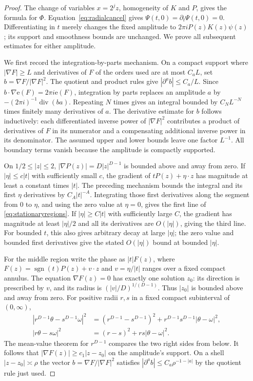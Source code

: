 \documentclass[11pt,oneside]{article}
\theoremstyle{definition}\newtheorem{definition}[theorem]{Definition}
\theoremstyle{remark}\newtheorem{remark}[theorem]{Remark}
\newcommand{\ee}[1]{\mathrm e\!\left(#1\right)}
\DeclareMathOperator{\sgn}{sgn}
\begin{document}
\begin{proof}
The change of variables $x=2^jz$, homogeneity of $K$ and $P$, gives the
formula for $\Phi$. Equation~\eqref{eq:radialcancel} gives
$\Psi(t,0)=\partial_t\Psi(t,0)=0$. Differentiating in $t$ merely changes the
fixed amplitude to $2\pi iP(z)K(z)\psi(z)$; its support and smoothness bounds
are unchanged. We prove all subsequent estimates for either amplitude.

We first record the integration-by-parts mechanism. On a compact support
where $|\nabla F|\geq L$ and derivatives of $F$ of the orders used are at most
$C_aL$, set $b=\nabla F/|\nabla F|^2$. The quotient and product rules give
$|\partial^a b|\leq C_a/L$. Since
$b\cdot\nabla\ee{F}=2\pi i\ee{F}$, integration by parts replaces an amplitude
$a$ by $-(2\pi i)^{-1}\operatorname{div}(ba)$. Repeating $N$ times gives an
integral bounded by $C_NL^{-N}$ times finitely many derivatives of $a$.
The derivative estimate for $b$ follows inductively: each differentiated
inverse power of $|\nabla F|^2$ contributes a product of derivatives of $F$
in its numerator and a compensating additional inverse power in its
denominator. The assumed upper and lower bounds leave one factor $L^{-1}$.
All boundary terms vanish because the amplitude is compactly supported.

On $1/2\leq|z|\leq2$, $|\nabla P(z)|=D|z|^{D-1}$ is bounded above and away
from zero. If $|\eta|\leq c|t|$ with sufficiently small $c$, the gradient of
$tP(z)+\eta\cdot z$ has magnitude at least a constant times $|t|$.
The preceding mechanism bounds the integral and its first $\eta$ derivatives
by $C_A|t|^{-A}$. Integrating those first derivatives along the segment from
$0$ to $\eta$, and using the zero value at $\eta=0$, gives the first line
of \eqref{eq:stationaryregions}. If $|\eta|\geq C|t|$ with sufficiently large
$C$, the gradient has magnitude at least $|\eta|/2$ and all its derivatives
are $O(|\eta|)$, giving the third line. For bounded $t$, this also gives
arbitrary decay at large $|\eta|$; the zero value and bounded first derivatives
give the stated $O(|\eta|)$ bound at bounded $|\eta|$.

For the middle region write the phase as
$|t|F(z)$, where $F(z)=\sgn(t)P(z)+v\cdot z$ and $v=\eta/|t|$ ranges over a
fixed compact annulus. The equation $\nabla F(z)=0$ has exactly one solution
$z_0$: its direction is prescribed by $v$, and its radius is
$(|v|/D)^{1/(D-1)}$. Thus $|z_0|$ is bounded above and away from zero.
For positive radii $r,s$ in a fixed compact subinterval of $(0,\infty)$,
\begin{align*}
 |r^{D-1}\theta-s^{D-1}\omega|^2
  &=(r^{D-1}-s^{D-1})^2
                 +r^{D-1}s^{D-1}|\theta-\omega|^2,\\
 |r\theta-s\omega|^2
  &=(r-s)^2+rs|\theta-\omega|^2.
\end{align*}
The mean-value theorem for $r^{D-1}$ compares the two right sides from below.
It follows that $|\nabla F(z)|\geq c_1|z-z_0|$ on the amplitude's support.
On a shell $|z-z_0|\asymp\rho$ the vector
$b=\nabla F/|\nabla F|^2$ satisfies
$|\partial^a b|\leq C_a\rho^{-1-|a|}$ by the quotient rule just used.


\end{proof}
\end{document}
